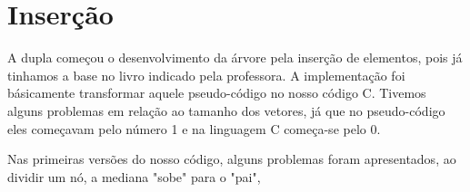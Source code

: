 \section{Inserção}
A dupla começou o desenvolvimento da árvore pela inserção de elementos, pois já tinhamos a base no livro indicado pela professora. A implementação foi básicamente transformar aquele pseudo-código no nosso código C. Tivemos alguns problemas em relação ao tamanho dos vetores, já que no pseudo-código eles começavam pelo número 1 e na linguagem C começa-se pelo 0.
\par Nas primeiras versões do nosso código, alguns problemas foram apresentados, ao dividir um nó, a mediana "sobe" para o "pai", 
